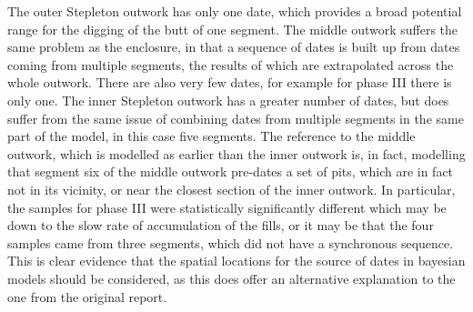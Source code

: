 The outer Stepleton outwork has only one date, which provides a broad potential range for the digging of the butt of one segment. The middle outwork suffers the same problem as the enclosure, in that a sequence of dates is built up from dates coming from multiple segments, the results of which are extrapolated across the whole outwork. There are also very few dates, for example for phase III there is only one. The inner Stepleton outwork has a greater number of dates, but does suffer from the same issue of combining dates from multiple segments in the same part of the model, in this case five segments. The reference to the middle outwork, which is modelled as earlier than the inner outwork is, in fact, modelling that segment six of the middle outwork pre-dates a set of pits, which are in fact not in its vicinity, or near the closest section of the inner outwork. In particular, the samples for phase III were statistically significantly different \cite[395]{Mercer:2008fk} which may be down to the slow rate of accumulation of the fills, or it may be that the four samples came from three segments, which did not have a synchronous sequence. This is clear evidence that the spatial locations for the source of dates in bayesian models should be considered, as this does offer an alternative explanation to the one from the original report.

